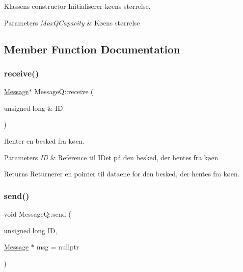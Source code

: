 Klassens constructor Initialiserer køens størrelse. 


\begin{DoxyParams}{Parameters}
{\em Max\+Q\+Capacity} & Køens størrelse \\
\hline
\end{DoxyParams}


\subsection{Member Function Documentation}
\mbox{\label{classMessageQ_a188ce4eab91cfe6dc0362d97f2a82f6e}} 
\subsubsection{\texorpdfstring{receive()}{receive()}}
{\footnotesize\ttfamily \hyperlink{classMessage}{Message}$\ast$ Message\+Q\+::receive (\begin{DoxyParamCaption}\item[{unsigned long \&}]{ID }\end{DoxyParamCaption})\hspace{0.3cm}{\ttfamily [inline]}}



Henter en besked fra køen. 


\begin{DoxyParams}{Parameters}
{\em ID} & Reference til ID\textquotesingle{}et på den besked, der hentes fra køen \\
\hline
\end{DoxyParams}
\begin{DoxyReturn}{Returns}
Returnerer en pointer til dataene for den besked, der hentes fra køen. 
\end{DoxyReturn}
\mbox{\label{classMessageQ_a7914a62e73bbdefa25db31e7279dd7bb}} 
\subsubsection{\texorpdfstring{send()}{send()}}
{\footnotesize\ttfamily void Message\+Q\+::send (\begin{DoxyParamCaption}\item[{unsigned long}]{ID,  }\item[{\hyperlink{classMessage}{Message} $\ast$}]{msg = {\ttfamily nullptr} }\end{DoxyParamCaption})\hspace{0.3cm}{\ttfamily [inline]}}



